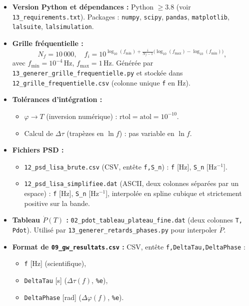 \begin{itemize}
  \item \textbf{Version Python et dépendances :}
    Python \(\ge3.8\) (voir \texttt{13\_requirements.txt}).
    Packages : \texttt{numpy}, \texttt{scipy}, \texttt{pandas}, \texttt{matplotlib}, \texttt{lalsuite}, \texttt{lalsimulation}.

  \item \textbf{Grille fréquentielle :}
    \[
      N_{f} = 10\,000,\quad
      f_{i} = 10^{\log_{10}(f_{\min}) + \frac{i}{N_{f}-1}\bigl(\log_{10}(f_{\max})-\log_{10}(f_{\min})\bigr)},
      \]
    avec \(f_{\min}=10^{-4}\,\mathrm{Hz}\), \(f_{\max}=1\,\mathrm{Hz}\).
    Générée par \texttt{13\_generer\_grille\_frequentielle.py} et stockée dans \texttt{12\_grille\_frequentielle.csv} (colonne unique \texttt{f} en Hz).

  \item \textbf{Tolérances d’intégration :}
    \begin{itemize}
      \item \(\varphi\to T\) (inversion numérique) : \(\mathrm{rtol}=\mathrm{atol}=10^{-10}\).
      \item Calcul de \(\Delta\tau\) (trapèzes en \(\ln f\)) : pas variable en \(\ln f\).
    \end{itemize}

  \item \textbf{Fichiers PSD :}
    \begin{itemize}
      \item \texttt{12\_psd\_lisa\_brute.csv} (CSV, entête \texttt{f,S\_n}) :
        \texttt{f} [Hz], \texttt{S\_n} [Hz\(^{-1}\)].
      \item \texttt{12\_psd\_lisa\_simplifiee.dat} (ASCII, deux colonnes séparées par un espace) :
        \texttt{f} [Hz], \texttt{S\_n} [Hz\(^{-1}\)], interpolée en spline cubique et strictement positive sur la bande.
    \end{itemize}

  \item \textbf{Tableau \(\dot P(T)\) :}
    \texttt{02\_pdot\_tableau\_plateau\_fine.dat} (deux colonnes \texttt{T, Pdot}).
    Utilisé par \texttt{13\_generer\_retards\_phases.py} pour interpoler \(\dot P\).

  \item \textbf{Format de \texttt{09\_gw\_resultats.csv} :}
    CSV, entête \texttt{f,DeltaTau,DeltaPhase} :
    \begin{itemize}
      \item \texttt{f} [Hz] (scientifique),
      \item \texttt{DeltaTau} [s] (\(\Delta\tau(f)\), \texttt{\%e}),
      \item \texttt{DeltaPhase} [rad] (\(\Delta\varphi(f)\), \texttt{\%e}).
    \end{itemize}


\end{itemize}
